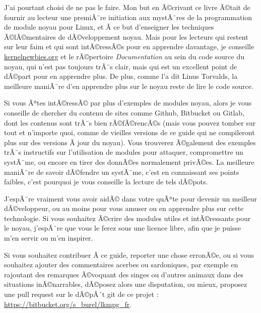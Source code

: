 \documentclass[11pt]{article}
\begin{document}
J'ai pourtant choisi de ne pas le faire. Mon but en Ã©crivant ce livre Ã©tait de fournir au lecteur une premiÃ¨re initiation aux mystÃ¨res de la programmation de module noyau pour Linux, et Ã  ce but d'enseigner les techniques Ã©lÃ©mentaires de dÃ©veloppement noyau. Mais pour les lecteurs qui restent sur leur faim et qui sont intÃ©ressÃ©s pour en apprendre davantage, je conseille \href{https://kernelnewbies.org}{kernelnewbies.org} et le rÃ©pertoire \emph{Documentation} au sein du code source du noyau, qui n'est pas toujours trÃ¨s clair, mais qui est un excellent point de dÃ©part pour en apprendre plus. De plus, comme l'a dit Linus Torvalds, la meilleure maniÃ¨re d'en apprendre plus sur le noyau reste de lire le code source.

Si vous Ãªtes intÃ©ressÃ© par plus d'exemples de modules noyau, alors je vous conseille de chercher du contenu de sites comme Github, Bitbucket ou Gitlab, dont les contenus sont trÃ¨s bien rÃ©fÃ©rencÃ©s (mais vous pouvez tomber sur tout et n'importe quoi, comme de vieilles versions de ce guide qui ne compileront plus sur des versions Ã  jour du noyau). Vous trouverez Ã©galement des exemples trÃ¨s instructifs sur l'utilisation de modules pour attaquer, compromettre un systÃ¨me, ou encore en tirer des donnÃ©es normalement privÃ©es. La meilleure maniÃ¨re de savoir dÃ©fendre un systÃ¨me, c'est en connaissant ses points faibles, c'est pourquoi je vous conseille la lecture de tels dÃ©pots.

J'espÃ¨re vraiment vous avoir aidÃ© dans votre quÃªte pour devenir un meilleur dÃ©veloppeur, ou au moins pour vous amuser ou en apprendre plus sur cette technologie. Si vous souhaitez Ã©crire des modules utiles et intÃ©ressants pour le noyau, j'espÃ¨re que vous le ferez sous une licence libre, afin que je puisse m'en servir ou m'en inspirer.

Si vous souhaitez contribuer Ã  ce guide, reporter une chose erronÃ©e, ou si vous souhaitez ajouter des commentaires acerbes ou sardoniques, par exemple en rajoutant des remarques Ã©voquant des singes ou d'autres animaux dans des situations inÃ©narrables, dÃ©posez alors une disputation, ou mieux, proposez une pull request sur le dÃ©pÃ´t git de ce projet : \url{https://bitbucket.org/s_burel/lkmpg_fr}.
\end{document}
